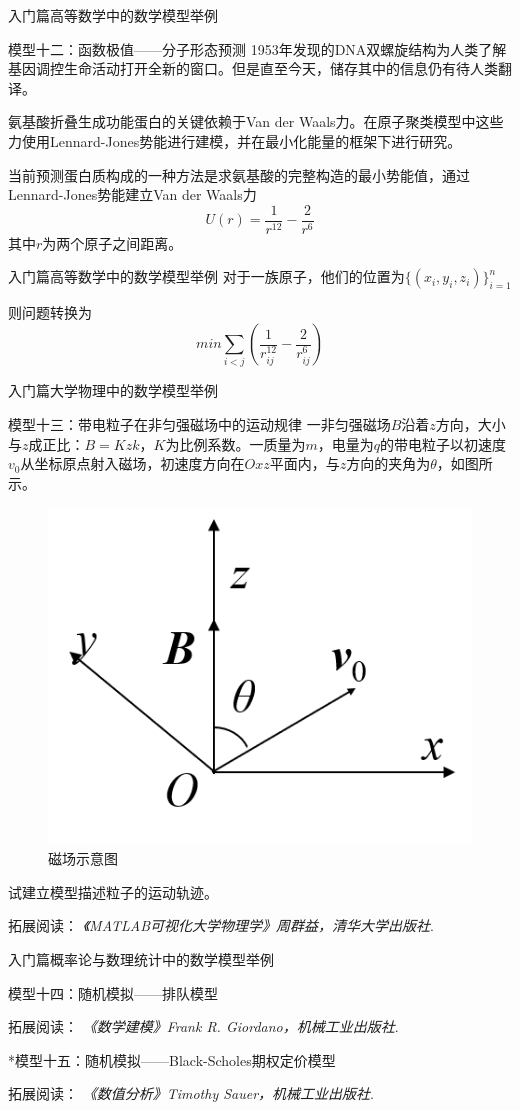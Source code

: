 \documentclass{beamer}
\begin{document}
\begin{frame}{入门篇}{高等数学中的数学模型举例}
\begin{block}{模型十二：函数极值——分子形态预测}
1953年发现的DNA双螺旋结构为人类了解基因调控生命活动打开全新的窗口。但是直至今天，储存其中的信息仍有待人类翻译。

氨基酸折叠生成功能蛋白的关键依赖于Van der Waals力。在原子聚类模型中这些力使用Lennard-Jones势能进行建模，并在最小化能量的框架下进行研究。

当前预测蛋白质构成的一种方法是求氨基酸的完整构造的最小势能值，通过Lennard-Jones势能建立Van der Waals力
$$U(r)=\frac{1}{r^{12}}-\frac{2}{r^6}$$
其中$r$为两个原子之间距离。
\end{block}
\end{frame}


\begin{frame}{入门篇}{高等数学中的数学模型举例}
对于一族原子，他们的位置为$\{(x_i,y_i,z_i)\}^n_{i=1}$

则问题转换为
$$min \sum\limits_{i<j}(\frac{1}{r_{ij}^{12}}-\frac{2}{r_{ij}^6})$$
\end{frame}


\begin{frame}{入门篇}{大学物理中的数学模型举例}
\begin{block}{模型十三：带电粒子在非匀强磁场中的运动规律}
一非匀强磁场$B$沿着$z$方向，大小与$z$成正比：$B = Kzk$，$K$为比例系数。一质量为$m$，电量为$q$的带电粒子以初速度$v_0$从坐标原点射入磁场，初速度方向在$Oxz$平面内，与$z$方向的夹角为$\theta$，如图所示。
\begin{figure}
  \centering
  \includegraphics[width=.3\textwidth]{figure//fig04.png} 
  \caption{磁场示意图} 
  \label{fig04} 
\end{figure}
试建立模型描述粒子的运动轨迹。

\footnotesize 拓展阅读：
\emph{《MATLAB可视化大学物理学》周群益，清华大学出版社}.
\end{block}
\end{frame}

\begin{frame}{入门篇}{概率论与数理统计中的数学模型举例}
\begin{block}{模型十四：随机模拟——排队模型}

\footnotesize 拓展阅读：
\emph{《数学建模》Frank R. Giordano，机械工业出版社}.
\end{block}

\begin{block}{*模型十五：随机模拟——Black-Scholes期权定价模型}

\footnotesize 拓展阅读：
\emph{《数值分析》Timothy Sauer，机械工业出版社}.
\end{block}
\end{frame}
\end{document}
